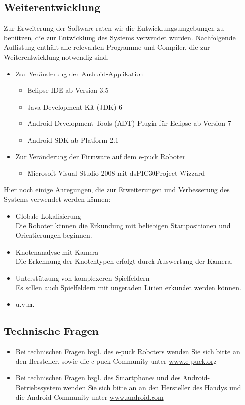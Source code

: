 \documentclass[10pt,a4paper]{article}
\begin{document}
	\subsection{Weiterentwicklung}
	Zur Erweiterung der Software raten wir die Entwicklungsumgebungen zu ben\"utzen, die zur Entwicklung des Systems verwendet wurden.
	Nachfolgende Auflistung enth\"alt alle relevanten Programme und Compiler, die zur Weiterentwicklung notwendig sind.
	\begin{itemize}
		\item{Zur Ver\"anderung der Android-Applikation}
		\begin{itemize}
			\item{Eclipse IDE ab Version 3.5}
			\item{Java Development Kit (JDK) 6}
			\item{Android Development Tools (ADT)-Plugin f\"ur Eclipse ab Version 7}
			\item{Android SDK ab Platform 2.1}
		\end{itemize}
		\item{Zur Ver\"anderung der Firmware auf dem e-puck Roboter}
		\begin{itemize}
			\item{Microsoft Visual Studio 2008 mit dsPIC30Project Wizzard}
		\end{itemize}
	\end{itemize}
	Hier noch einige Anregungen, die zur Erweiterungen und Verbesserung des Systems verwendet werden k\"onnen:
	\begin{itemize}
		\item{Globale Lokalisierung} \\ Die Roboter k\"onnen die Erkundung mit beliebigen Startpositionen und Orientierungen beginnen.
		\item{Knotenanalyse mit Kamera} \\ Die Erkennung der Knotentypen erfolgt durch Auswertung der Kamera.
		\item{Unterst\"utzung von komplexeren Spielfeldern} \\ Es sollen auch Spielfeldern mit ungeraden Linien erkundet werden k\"onnen.
		\item{u.v.m.}
	\end{itemize}
	\subsection{Technische Fragen}
		\begin{itemize}
			\item{Bei technischen Fragen bzgl. des e-puck Roboters wenden Sie sich bitte an den Hersteller, sowie die e-puck Community unter
				\url{www.e-puck.org}}
			\item{Bei technischen Fragen bzgl. des Smartphones und des Android-Betriebssystem wenden Sie sich bitte an an den Hersteller des Handys
				und die Android-Community unter \url{www.android.com}}
		\end{itemize}
				 
		
\end{document}
